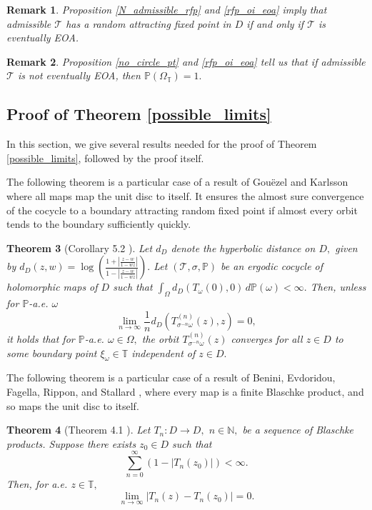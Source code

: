 \documentclass[12pt,reqno]{amsart}
\newtheorem{theorem}{Theorem}
\numberwithin{theorem}{section}
\newtheorem{remark}[theorem]{Remark}%
\begin{document}
\begin{remark}
    Proposition  \ref{N_admissible_rfp} and \ref{rfp_oi_eoa} imply that admissible $\mathcal{T}$ has a random attracting fixed point in $D$ if and only if $\mathcal{T}$ is eventually EOA.
\end{remark}

\begin{remark}
    Proposition \ref{no_circle_pt} and \ref{rfp_oi_eoa} tell us that if admissible $\mathcal{T}$ is not eventually EOA, then $\mathbb{P}(\Omega_{\mathbb{T}})=1.$
\end{remark}

\subsection{Proof of Theorem \ref{possible_limits}}\label{section_proof_main_thm}

In this section, we give several results needed for the proof of Theorem \ref{possible_limits}, followed by the proof itself.


The following theorem is a particular case of a result of Gouëzel and Karlsson \cite[Corollary 5.2]{subadditive_MET} where all maps map the unit disc to itself. It ensures the almost sure convergence of the cocycle to a boundary attracting random fixed point if almost every orbit tends to the boundary sufficiently quickly. 


\begin{theorem}[Corollary 5.2 \cite{subadditive_MET}]\label{contract_disc_conv}
    Let $d_{D}$ denote the hyperbolic distance on $D,$ given by $d_{D}(z,w)=\log\left(\frac{1+\left|\frac{z-w}{1-\bar{w}z}\right|}{1-\left|\frac{z-w}{1-\bar{w}z}\right|}\right).$ Let $(\mathcal{T}, \sigma, \mathbb{P})$ be an ergodic cocycle of holomorphic maps of $D$ such that $\int_{\Omega}d_{D}(T_{\omega}(0),0)\,d\mathbb{P}(\omega)<\infty.$ Then, unless for $\mathbb{P}$-a.e. $\omega$ $$\lim_{n\to\infty}\frac{1}{n}d_{D}(T_{\sigma^{-n}\omega}^{(n)}(z),z)=0,$$ it holds that for $\mathbb{P}$-a.e. $\omega\in\Omega,$ the orbit $T_{\sigma^{-n}\omega}^{(n)}(z)$ converges for all $z\in D$ to some boundary point $\xi_{\omega}\in\mathbb{T}$ independent of $z\in D.$
\end{theorem}

The following theorem is a particular case of a result of Benini, Evdoridou, Fagella, Rippon, and Stallard \cite[Theorem 4.1]{benini_1}, where every map is a finite Blaschke product, and so maps the unit disc to itself.
\begin{theorem}[Theorem 4.1 \cite{benini_1}]\label{holomorphic_sequence}
    Let $T_{n}:D\to D,$ $n\in\mathbb{N},$ be a sequence of Blaschke products. Suppose there exists $z_{0}\in D$ such that $$\sum_{n=0}^{\infty}(1-|T_{n}(z_{0})|)<\infty.$$ Then, for a.e. $z\in \mathbb{T},$ $$\lim_{n\to\infty}|T_{n}(z)-T_{n}(z_{0})|=0.$$
\end{theorem}
\end{document}
